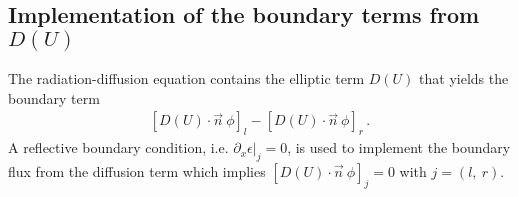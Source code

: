 \subsection{Implementation of the boundary terms from $D(U)$}
%
The radiation-diffusion equation contains the elliptic term $D(U)$ that yields the boundary term 
%
\begin{eqnarray}
\left[D(U)\cdot \vec{n} \ \phi \right]_{l} - \left[D(U)\cdot \vec{n} \ \phi \right]_{r} \, . \nonumber
\end{eqnarray}
%
A reflective boundary condition, i.e. $\left. \partial_x \epsilon \right|_j = 0$, is used to implement the boundary flux from the diffusion term
%
%
which implies $\left[D(U)\cdot \vec{n} \ \phi \right]_{j} = 0$ with $j = \left( l, \ r \right)$.
%
% 
